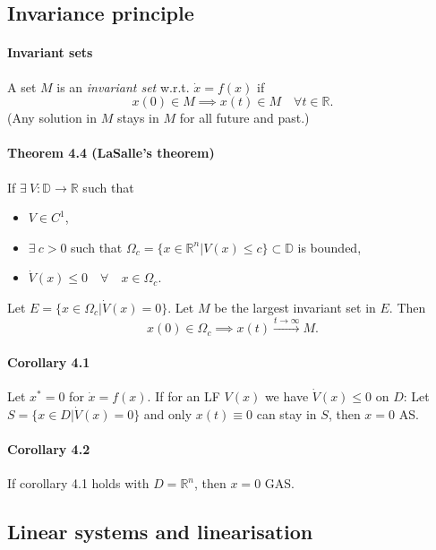 \subsection{Invariance principle}
\paragraph{Invariant sets} A set $M$ is an \emph{invariant set} w.r.t. $\dot{x} = f(x)$ if
\begin{equation}
	x(0) \in M \implies x(t) \in M \quad \forall t \in \mathbb{R}.
\end{equation}
(Any solution in $M$ stays in $M$ for all future and past.)

\paragraph{Theorem 4.4 (LaSalle's theorem)}
If $\exists \: V : \mathbb{D} \to \mathbb{R}$ such that
\begin{itemize}
	\item $V \in C^1$,
	\item $\exists \: c > 0$ such that $\Omega_c = \{x \in \mathbb{R}^n | V(x) \leq c \} \subset \mathbb{D}$ is bounded,
	\item $\dot{V}(x) \leq 0 \quad \forall \quad x \in \Omega_c$.
\end{itemize}
Let $E = \{ x \in \Omega_c | \dot{V}(x) = 0 \}$. Let $M$ be the largest invariant set in $E$. Then
\begin{equation}
	x(0) \in \Omega_c \implies x(t) \xrightarrow{t \to \infty} M.
\end{equation}

\paragraph{Corollary 4.1} Let $x^* = 0$ for $\dot{x} = f(x)$. If for an LF $V(x)$ we have $\dot{V}(x) \leq 0$ on $D$: Let $S = \{ x \in D | \dot{V}(x) = 0 \}$ and only $x(t) \equiv 0$ can stay in $S$, then $x = 0$ AS.

\paragraph{Corollary 4.2} If corollary 4.1 holds with $D = \mathbb{R}^n$, then $x = 0$ GAS.

\subsection{Linear systems and linearisation}
